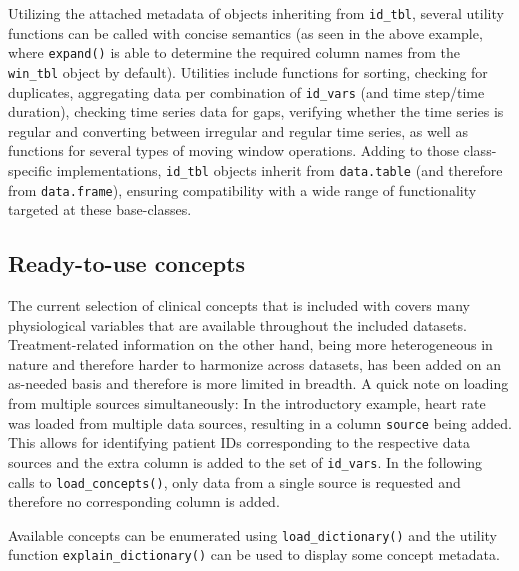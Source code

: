 \documentclass[
  notitle]{jss}
\begin{document}
Utilizing the attached metadata of objects inheriting from
\texttt{id\_tbl}, several utility functions can be called with concise
semantics (as seen in the above example, where \texttt{expand()} is able
to determine the required column names from the \texttt{win\_tbl} object
by default). Utilities include functions for sorting, checking for
duplicates, aggregating data per combination of \texttt{id\_vars} (and
time step/time duration), checking time series data for gaps, verifying
whether the time series is regular and converting between irregular and
regular time series, as well as functions for several types of moving
window operations. Adding to those class-specific implementations,
\texttt{id\_tbl} objects inherit from \texttt{data.table} (and therefore
from \texttt{data.frame}), ensuring compatibility with a wide range of
functionality targeted at these base-classes.

\hypertarget{ready-to-use-concepts}{%
\subsection{Ready-to-use concepts}\label{ready-to-use-concepts}}

The current selection of clinical concepts that is included with
 covers many physiological variables that are available
throughout the included datasets. Treatment-related information on the
other hand, being more heterogeneous in nature and therefore harder to
harmonize across datasets, has been added on an as-needed basis and
therefore is more limited in breadth. A quick note on loading from
multiple sources simultaneously: In the introductory example, heart rate
was loaded from multiple data sources, resulting in a column
\texttt{source} being added. This allows for identifying patient IDs
corresponding to the respective data sources and the extra column is
added to the set of \texttt{id\_vars}. In the following calls to
\texttt{load\_concepts()}, only data from a single source is requested
and therefore no corresponding column is added.

Available concepts can be enumerated using \texttt{load\_dictionary()}
and the utility function \texttt{explain\_dictionary()} can be used to
display some concept metadata.
\end{document}
